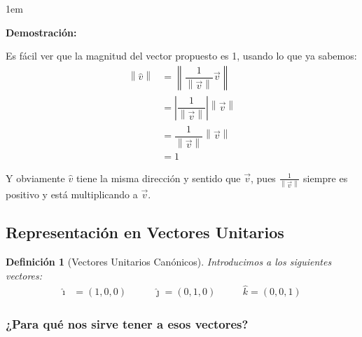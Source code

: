 \documentclass[12pt, fleqn]{report}                             %
\newenvironment{SmallIndentation}[1][0.75em]                    %
        {\begin{adjustwidth}{#1}{}\begin{footnotesize}}             %
        {\end{footnotesize}\end{adjustwidth}}                       %
\DeclareMathOperator \MegaSpace {\quad \quad}                   %
\newtheorem{Definition}     {Definición}[section]               %
\theoremstyle{break}                                            %
\newcommand{\hati}      {\hat{\imath}}                           %
\newcommand{\hatj}      {\hat{\jmath}}                           %
\newcommand{\hatk}      {\hat{k}}                                %
\newcommand{\abs}[1]    {\left\lvert #1 \right\lvert}           %
\newcommand{\Abs}[1]    {\left\lVert #1 \right\lVert}           %
\begin{document}
                \begin{SmallIndentation}[1em]
                    \textbf{Demostración:}

                    Es fácil ver que la magnitud del vector propuesto es 1, usando lo que ya sabemos:
                    \begin{align*}
                        \Abs{\hat{v}} 
                            &= \Abs{\dfrac{1}{\Abs{\vec{v}}} \vec{v}}               \\
                            &= \abs{\dfrac{1}{\Abs{\vec{v}}}} \Abs{\vec{v}}         \\
                            &= \dfrac{1}{\Abs{\vec{v}}} \Abs{\vec{v}}               \\
                            &= 1
                    \end{align*}

                    Y obviamente $\hat{v}$ tiene la misma dirección y sentido que $\vec{v}$,
                    pues $\frac{1}{\Abs{\vec{v}}}$ siempre es positivo y está multiplicando a $\vec{v}$.

                \end{SmallIndentation}
            
            \clearpage
            \subsection{Representación en Vectores Unitarios}
        
                \begin{Definition}[Vectores Unitarios Canónicos]
                    
                    Introducimos a los siguientes vectores:
                    \begin{align}
                        \hati &= (1, 0, 0) \MegaSpace \hatj = (0, 1, 0) \MegaSpace \hatk = (0, 0, 1)
                    \end{align}

                \end{Definition}
            
                \subsubsection{¿Para qué nos sirve tener a esos vectores?}
\end{document}
